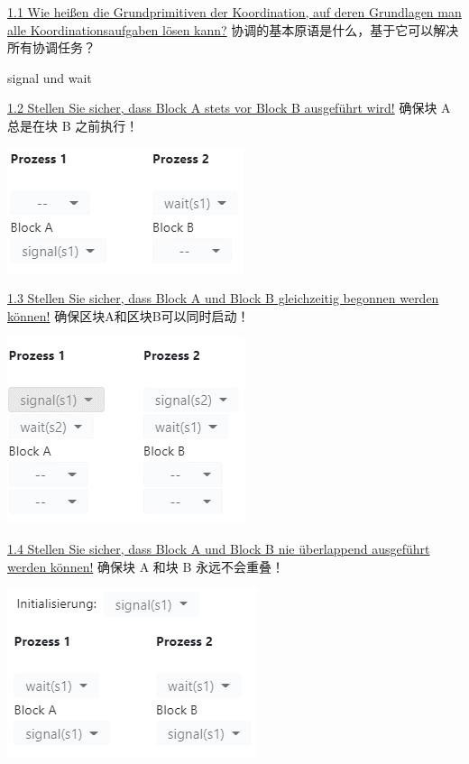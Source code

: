 \documentclass[fleqn]{article}
\begin{document}
\noindent\uline{1.1	Wie heißen die Grundprimitiven der Koordination, auf deren Grundlagen man alle Koordinationsaufgaben lösen kann?}
协调的基本原语是什么，基于它可以解决所有协调任务？

signal und wait

\noindent\uline{1.2 Stellen Sie sicher, dass Block A stets vor Block B ausgeführt wird!}
确保块 A 总是在块 B 之前执行！

\begin{center}
    \includegraphics{27.png}
\end{center}

\noindent\uline{1.3 Stellen Sie sicher, dass Block A und Block B gleichzeitig begonnen werden können!}
确保区块A和区块B可以同时启动！

\begin{center}
    \includegraphics{28.png}
\end{center}

\noindent\uline{1.4 Stellen Sie sicher, dass Block A und Block B nie überlappend ausgeführt werden können!}
确保块 A 和块 B 永远不会重叠！

\begin{center}
    \includegraphics{29.png}
\end{center}
\end{document}
